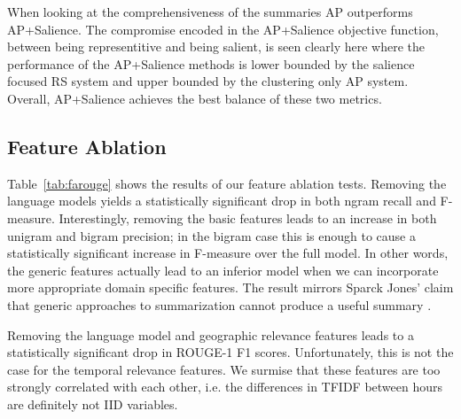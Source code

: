 When looking at the comprehensiveness of the summaries AP outperforms
 AP+Salience. The compromise encoded in the AP+Salience objective
function, between being representitive and being salient, is seen clearly here
where the performance of the AP+Salience methods is lower bounded by 
the salience focused RS
system and upper bounded by the clustering only AP system.
Overall, AP+Salience achieves the best balance of these two metrics.



\subsection{Feature Ablation}


Table~\ref{tab:farouge} shows the results of our feature ablation
tests. Removing the language models yields a statistically 
significant drop in both ngram recall and F-measure. 
Interestingly, removing the basic features leads to an
increase in both unigram and bigram precision; in the bigram
case this is enough to cause a statistically significant increase
in F-measure over the full model. In other words, the generic features
actually lead to an inferior model when we can incorporate more appropriate
domain specific features.
The result mirrors Sparck Jones' claim that generic approaches to summarization cannot produce a useful summary \cite{ksj98}.

Removing the language model and geographic relevance features leads to a
statistically significant drop in ROUGE-1 F1 scores. Unfortunately,
this is not the case for the temporal relevance features. We surmise that
these features are too strongly correlated with each other, 
i.e. the differences in TFIDF between hours are definitely not IID variables. 




